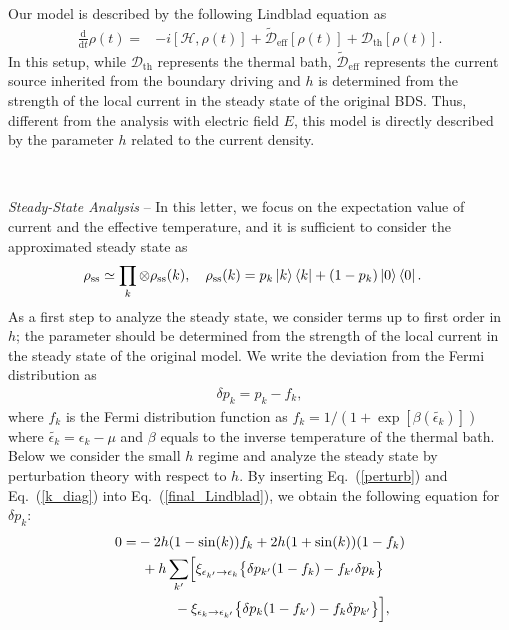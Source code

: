 \documentclass[a4paper, amsfonts, amssymb, amsmath, reprint, showkeys, nofootinbib, twoside,superscriptaddress, prl]{revtex4-2}
\newcommand{\m}[1]{\mathcal{#1}}
\newcommand{\mr}[1]{\mathrm{#1}}
\newcommand{\sk}{\sin(k)}
\newcommand{\epk}{\epsilon_k}
\newcommand{\epkp}{\epsilon_{k'}}
\newcommand{\dt}{\frac{\mathrm{d}}{\mathrm{d}t}}
\begin{document}
Our model is described by the following Lindblad equation as
\begin{align}
\dt \rho(t) =& -i[\m{H},\rho(t)] + \tilde{\m{D}}_{\mr{eff}}[\rho(t)] + \m{D}_{\mr{th}}[\rho(t)].\label{final_Lindblad}
\end{align}
In this setup, while $\m{D}_{\mr{th}}$ represents the thermal bath, $\tilde{\m{D}}_{\mr{eff}}$ represents the current source inherited from the boundary driving and $h$ is determined from the strength of the local current in the steady state of the original BDS. Thus, different from the analysis with electric field $E$, this model is directly described by the parameter $h$ related to the current density. 

\

{\it{Steady-State Analysis}} --
In this letter, we focus on the expectation value of current and the effective temperature, and it is sufficient to consider the approximated steady state as
\begin{align}
\rho_{\mr{ss}}&\simeq \prod_k\otimes\rho_{\mr{ss}}(k),\quad \rho_{\mr{ss}}(k) = p_k \ket{k}\bra{k} + (1-p_k)\ket{0} \bra{0}.\label{k_diag}
\end{align}
As a first step to analyze the steady state, we consider terms up to first order in $h$; the parameter should be determined from the strength of the local current in the steady state of the original model. We write the deviation from the Fermi distribution as
\begin{align}
    \delta p_k = p_k - f_k, \label{perturb}
\end{align}
where $f_k$ is the Fermi distribution function as $f_k = 1/(1+\exp[\beta(\tilde{\epsilon_k})])$ where $\tilde{\epsilon_k} = \epk -\mu$ and $\beta$ equals to the inverse temperature of the thermal bath. Below we consider the small $h$ regime and analyze the steady state by perturbation theory with respect to $h$.
By inserting Eq.~(\ref{perturb}) and Eq.~(\ref{k_diag}) into Eq.~(\ref{final_Lindblad}), we obtain the following equation for $\delta p_k$:
\begin{align}
    0=&-2h(1-\sk)f_k + 2h(1+\sk)(1-f_k)\nonumber\\
    & \  + h\sum_{k'}\Bigl[\xi_{\epkp\rightarrow\epk}\bigl\{\delta p_{k'}(1-f_k) - f_{k'}\delta p_k \bigr\}\nonumber\\
    & \ \ \ \ \ \ \ \ -\xi_{\epk\rightarrow\epkp}\bigl\{\delta p_k(1-f_{k'}) - f_{k}\delta p_{k'} \bigr\}\Bigr],\label{ss_equation}
\end{align}
\end{document}
